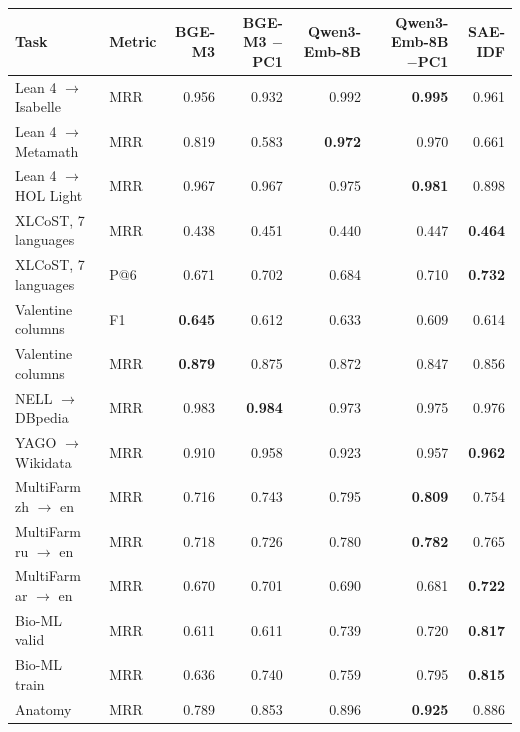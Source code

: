 \begin{tabular}{@{}llrrrrr@{}}
\toprule
Task & Metric & BGE-M3 & BGE-M3 $-$PC1 & Qwen3-Emb-8B & Qwen3-Emb-8B $-$PC1 & \textbf{SAE-IDF} \\
\midrule
Lean 4 $\to$ Isabelle & MRR & 0.956 & 0.932 & 0.992 & \textbf{0.995} & 0.961 \\
Lean 4 $\to$ Metamath & MRR & 0.819 & 0.583 & \textbf{0.972} & 0.970 & 0.661 \\
Lean 4 $\to$ HOL Light & MRR & 0.967 & 0.967 & 0.975 & \textbf{0.981} & 0.898 \\
XLCoST, 7 languages & MRR & 0.438 & 0.451 & 0.440 & 0.447 & \textbf{0.464} \\
XLCoST, 7 languages & P@6 & 0.671 & 0.702 & 0.684 & 0.710 & \textbf{0.732} \\
Valentine columns & F1 & \textbf{0.645} & 0.612 & 0.633 & 0.609 & 0.614 \\
Valentine columns & MRR & \textbf{0.879} & 0.875 & 0.872 & 0.847 & 0.856 \\
NELL $\to$ DBpedia & MRR & 0.983 & \textbf{0.984} & 0.973 & 0.975 & 0.976 \\
YAGO $\to$ Wikidata & MRR & 0.910 & 0.958 & 0.923 & 0.957 & \textbf{0.962} \\
MultiFarm zh $\to$ en & MRR & 0.716 & 0.743 & 0.795 & \textbf{0.809} & 0.754 \\
MultiFarm ru $\to$ en & MRR & 0.718 & 0.726 & 0.780 & \textbf{0.782} & 0.765 \\
MultiFarm ar $\to$ en & MRR & 0.670 & 0.701 & 0.690 & 0.681 & \textbf{0.722} \\
\midrule
Bio-ML valid & MRR & 0.611 & 0.611 & 0.739 & 0.720 & \textbf{0.817} \\
Bio-ML train & MRR & 0.636 & 0.740 & 0.759 & 0.795 & \textbf{0.815} \\
Anatomy & MRR & 0.789 & 0.853 & 0.896 & \textbf{0.925} & 0.886 \\
\bottomrule
\end{tabular}
